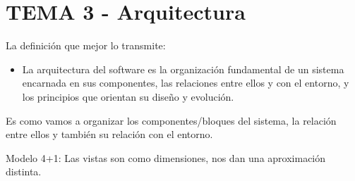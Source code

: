 \documentclass[12pt, twoside, openright]{report} %
\begin{document}
\chapter{TEMA 3 - Arquitectura}


La definición que mejor lo transmite:

\begin{itemize}
\item
	La arquitectura del software es la organización fundamental de un
	sistema encarnada en sus componentes, las relaciones entre ellos y
	con el entorno, y los principios que orientan su diseño y
	evolución.
\end{itemize}

Es como vamos a organizar los componentes/bloques del sistema, la
relación entre ellos y también su relación con el entorno.

Modelo 4+1: Las vistas son como dimensiones, nos dan una
aproximación distinta.
\end{document}
